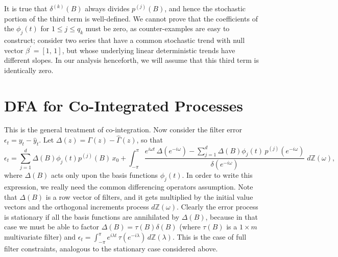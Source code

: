 \documentclass[a4paper]{book}
\def\ZZ{\mathbb Z}
\begin{document}
 It is true that $\delta^{(k)} (B)$
 always divides $p^{(j)} (B)$, and hence the stochastic portion of
 the third term is well-defined.  We cannot prove that the
 coefficients of the $\phi_j (t)$ for $1 \leq j \leq q_k$ must be
 zero, as counter-examples are easy to construct; consider two series that
 have a common stochastic trend with null vector $\beta^{\prime} =
 [1, \, 1]$, but whose underlying linear deterministic trends have
different slopes.  
  In our analysis henceforth, we
 will assume that this third term is identically zero.

\section{DFA for Co-Integrated Processes}


 This is the general treatment of co-integration.  Now consider the
 filter error $\epsilon_t = y_t - \widehat{y}_t$.  Let $\Delta(z) = \Gamma
 (z) - \widehat{\Gamma} (z)$, so that
\[
 \epsilon_t = \sum_{j=1}^d \Delta(B) \phi_j (t) p^{(j)} (B) \, x_{0} + \int_{-\pi}^{\pi}
 \frac{ e^{i \omega t} \, \Delta (e^{-i \omega})
 - \sum_{j=1}^d \Delta (B) \phi_j (t) \, p^{(j)} ( e^{-i \omega
 } )}{ \delta (e^{-i \omega}) } \; d \ZZ (\omega),
\]
 where $\Delta (B)$ acts only upon the basis functions $\phi_j (t)$.
  In order to write this expression, we really need the common
  differencing operators assumption.  Note that $\Delta (B) $ is a
  row vector of filters, and it gets multiplied by the initial value
  vectors and the orthogonal increments process $d\ZZ(\omega)$.
  Clearly the error process is stationary if all the basis functions
  are annihilated by $\Delta (B)$, because in that case we must be
  able to factor $\Delta (B) = \tau (B) \delta (B)$ (where $\tau (B)$ is
  a $1 \times m$ multivariate filter) and $\epsilon_t
  = \int_{-\pi}^{\pi} e^{i \lambda t } \, \tau (e^{-i \lambda}) \,
  d\ZZ (\lambda)$.  This is the case of full filter constraints,
  analogous to the stationary case considered above. 
\end{document}
